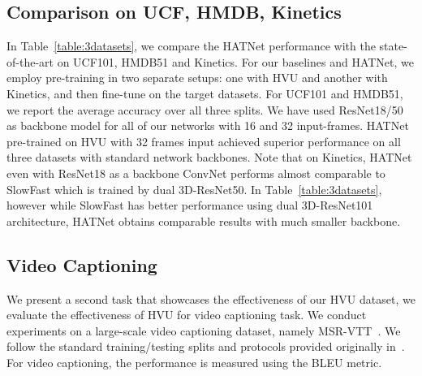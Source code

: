 \documentclass[runningheads]{llncs}
\begin{document}
\begin{table}[t] 
\centering
\small
\tabcolsep=0.10cm
\caption{Captioning performance comparisons of \cite{xgate} with different models and pre-training datasets. M denotes the motion features from optical flow extracted as in the original paper.} \label{table:captioning}
\vspace{-0.8cm}
\end{table}

\subsection{Comparison on UCF, HMDB, Kinetics}
In Table~\ref{table:3datasets}, we compare the HATNet performance with the state-of-the-art on UCF101, HMDB51 and Kinetics. For our baselines and HATNet, we employ pre-training in two separate setups: one with HVU and another with Kinetics, and then fine-tune on the target datasets. For UCF101 and HMDB51, we report the average accuracy over all three splits. We have used ResNet18/50 as backbone model for all of our networks with 16 and 32 input-frames. HATNet pre-trained on HVU with 32 frames input achieved superior performance on all three datasets with standard network backbones. Note that on Kinetics, HATNet even with ResNet18 as a backbone ConvNet performs almost comparable to SlowFast which is trained by dual 3D-ResNet50. In Table~\ref{table:3datasets}, however while SlowFast has better performance using dual 3D-ResNet101 architecture, HATNet obtains comparable results with much smaller backbone.\vspace{-0.4cm}

\subsection{Video Captioning}
We present a second task that showcases the effectiveness of our HVU dataset, we evaluate the effectiveness of HVU for video captioning task. We conduct experiments on a large-scale video captioning dataset, namely MSR-VTT~\cite{MSRVTT}. We follow the standard training/testing splits and protocols provided originally in~\cite{MSRVTT}. For video captioning, the performance is measured using the BLEU metric.  
\end{document}
